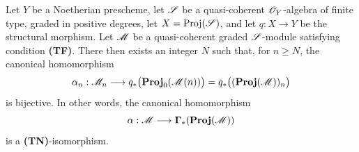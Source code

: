 \begin{theorem}[2.3.1]
\label{III.2.3.1}
Let $Y$ be a Noetherian prescheme, let $\mathscr{S}$ be a quasi-coherent $\mathscr{O}_Y$-algebra of finite type, graded in positive degrees, let $X=\operatorname{Proj}(\mathscr{S})$,
and let $q:X\to Y$ be the structural morphism.
Let $\mathscr{M}$ be a quasi-coherent graded $\mathscr{S}$-module satisfying condition \textup{\textbf{(TF)}}.
There then exists an integer $N$ such that, for $n\geq N$, the canonical homomorphism 
\[
  \alpha_n:\mathscr{M}_n
  \longrightarrow q_*\bigl(\operatorname{\mathbf{Proj}}_0(\mathscr{M}(n))\bigr)
  =q_*\bigl((\operatorname{\mathbf{Proj}}(\mathscr{M}))_n\bigr)
\]
is bijective.
In other words, the canonical homomorphism
\[
  \alpha:\mathscr{M}\longrightarrow\boldsymbol{\Gamma}_*(\operatorname{\mathbf{Proj}}(\mathscr{M}))
\]
is a \textup{\textbf{(TN)}}-isomorphism.
\end{theorem}

